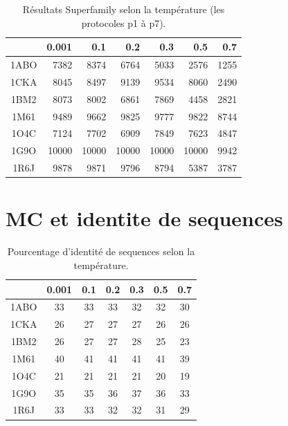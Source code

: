 \documentclass[a4paper,12pt]{article}
\begin{document}
    \begin{table}[!htbp]
      \centering

      \begin{tabular}{|c|r|r|r|r|r|r|}

        \hline
         & 0.001 & 0.1 & 0.2  & 0.3 & 0.5 & 0.7  \\
        \hline
        1ABO & 7382  & 8374 & 6764 & 5033 & 2576  & 1255  \\      
        1CKA & 8045  & 8497 & 9139 & 9534 & 8060  & 2490  \\  
        1BM2 & 8073  & 8002 & 6861 & 7869 & 4458  & 2821  \\  
        1M61 & 9489  & 9662 & 9825 & 9777 & 9822  & 8744  \\  
        1O4C & 7124  & 7702 & 6909 & 7849 & 7623  & 4847  \\  
        1G9O & 10000 & 10000 & 10000 & 10000 & 10000  & 9942 \\  
        1R6J & 9878  & 9871 & 9796 & 8794 & 5387 & 3787 \\  \hline
        
      \end{tabular}
      
      \caption{Résultats Superfamily selon la température (les protocoles p1 à p7).}      
      \label{tab_temp}

    \end{table}



    \section{MC et identite de sequences}


    \begin{table}[!htbp]
      \centering
      
      \begin{tabular}{|c|c|c|c|c|c|c|}
      
        \hline
        & 0.001 & 0.1 & 0.2  & 0.3 & 0.5 & 0.7  \\
        \hline
        1ABO & 33 & 33 & 33 & 32 & 32  & 30 \\      
        1CKA & 26 & 27 & 27 & 27 & 26  & 26 \\  
        1BM2 & 26 & 27 & 27 & 28 & 25  & 23 \\  
        1M61 & 40 & 41 & 41 & 41 & 41  & 39 \\  
        1O4C & 21 & 21 & 21 & 21 & 20  & 19 \\  
        1G9O & 35 & 35 & 36 & 37 & 36  & 33 \\  
        1R6J & 33 & 33 & 32 & 32 & 31  & 29 \\  \hline
        
      \end{tabular}
      

      \caption{Pourcentage d'identité de sequences selon la température.}      
      \label{tab_ident}
    \end{table}
\end{document}
